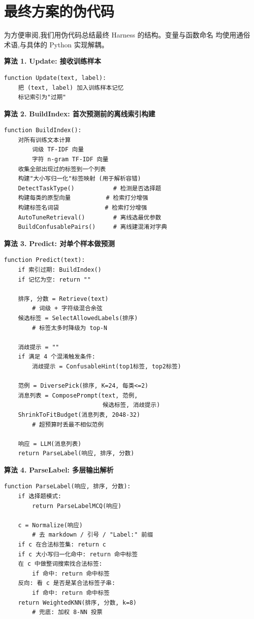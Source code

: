 \documentclass[10pt,twocolumn,letterpaper]{article}
\begin{document}
\section{最终方案的伪代码}
\label{sec:pseudocode}

为方便审阅,我们用伪代码总结最终 Harness 的结构。变量与函数命名
均使用通俗术语,与具体的 Python 实现解耦。

\medskip
\noindent\textbf{算法 1. Update: 接收训练样本}
\begin{verbatim}
function Update(text, label):
    把 (text, label) 加入训练样本记忆
    标记索引为"过期"
\end{verbatim}

\medskip
\noindent\textbf{算法 2. BuildIndex: 首次预测前的离线索引构建}
\begin{verbatim}
function BuildIndex():
    对所有训练文本计算
        词级 TF-IDF 向量
        字符 n-gram TF-IDF 向量
    收集全部出现过的标签到一个列表
    构建"大小写归一化"标签映射 (用于解析容错)
    DetectTaskType()           # 检测是否选择题
    构建每类的原型向量          # 检索打分增强
    构建标签名词袋             # 检索打分增强
    AutoTuneRetrieval()        # 离线选最优参数
    BuildConfusablePairs()     # 离线建混淆对字典
\end{verbatim}

\medskip
\noindent\textbf{算法 3. Predict: 对单个样本做预测}
\begin{verbatim}
function Predict(text):
    if 索引过期: BuildIndex()
    if 记忆为空: return ""

    排序, 分数 = Retrieve(text)
        # 词级 + 字符级混合余弦
    候选标签 = SelectAllowedLabels(排序)
        # 标签太多时降级为 top-N

    消歧提示 = ""
    if 满足 4 个混淆触发条件:
        消歧提示 = ConfusableHint(top1标签, top2标签)

    范例 = DiversePick(排序, K=24, 每类<=2)
    消息列表 = ComposePrompt(text, 范例,
                            候选标签, 消歧提示)
    ShrinkToFitBudget(消息列表, 2048-32)
        # 超预算时丢最不相似范例

    响应 = LLM(消息列表)
    return ParseLabel(响应, 排序, 分数)
\end{verbatim}

\medskip
\noindent\textbf{算法 4. ParseLabel: 多层输出解析}
\begin{verbatim}
function ParseLabel(响应, 排序, 分数):
    if 选择题模式:
        return ParseLabelMCQ(响应)

    c = Normalize(响应)
        # 去 markdown / 引号 / "Label:" 前缀
    if c 在合法标签集: return c
    if c 大小写归一化命中: return 命中标签
    在 c 中做整词搜索找合法标签:
        if 命中: return 命中标签
    反向: 看 c 是否是某合法标签子串:
        if 命中: return 命中标签
    return WeightedKNN(排序, 分数, k=8)
        # 兜底: 加权 8-NN 投票
\end{verbatim}
\end{document}
